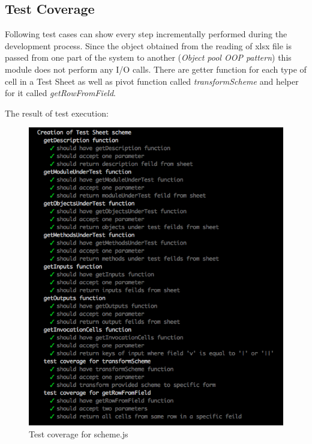 \subsection{Test Coverage}
Following test cases can show every step incrementally performed during the development process. Since the object obtained from the reading of xlsx file is passed from one part of the system to another (\textit{Object pool OOP pattern}) this module does not perform any I/O calls. There are getter function for each type of cell in a Test Sheet as well as pivot function called \textit{transformScheme} and helper for it called \textit{getRowFromField}.
%

The result of test execution:
\begin{figure}[H]
	\centering
	\includegraphics[width=\linewidth]{grafiken/testScheme.png}
	\caption{Test coverage for scheme.js}
	\label{fig:testScheme}
\end{figure}

